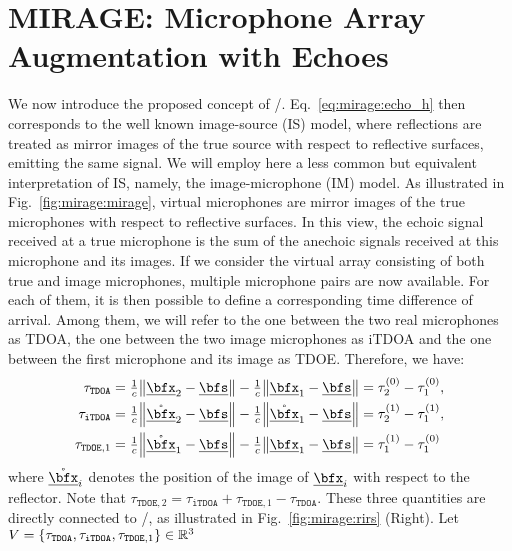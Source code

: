 \section{MIRAGE: Microphone Array Augmentation with Echoes}\label{sec:mirage:mirage}
We now introduce the proposed concept of \MIRAGEdef/.
Eq.~\cref{eq:mirage:echo_h} then corresponds to the well known image-source (IS) model,
where reflections are treated as mirror images of the true source with respect to reflective surfaces,
emitting the same signal.
We will employ here a less common but equivalent interpretation of IS,
namely, the image-microphone (IM) model. As illustrated in Fig.~\cref{fig:mirage:mirage},
virtual microphones are mirror images of the true microphones with respect to reflective surfaces.
In this view, the echoic signal received at a true microphone
is the sum of the anechoic signals received at this microphone and its images.
If we consider the virtual array consisting of both true and image microphones,
multiple microphone pairs are now available. For each of them,
it is then possible to define a corresponding time difference of arrival.
Among them, we will refer to the one between the two real microphones as \ac{TDOA}, the one between the two image microphones as \ac{iTDOA} and the one between the first microphone and its image as \ac{TDOE}.
Therefore, we have:
\begin{align}
\tau_\mathtt{TDOA}  &= \tfrac{1}{c} \norm{\positionMicrophone_2 - \positionSource} - \tfrac{1}{c} \norm{\positionMicrophone_1 - \positionSource} = \tau_2^{(0)} - \tau_1^{(0)},\\
\tau_\mathtt{iTDOA} &= \tfrac{1}{c} \norm{\mathring{\positionMicrophone}_2 - \positionSource} - \tfrac{1}{c} \norm{\mathring{\positionMicrophone}_1 - \positionSource} = \tau_2^{(1)} - \tau_1^{(1)},\\
\tau_{\mathtt{TDOE},1}  &= \tfrac{1}{c} \norm{\mathring{\positionMicrophone}_1 - \positionSource} - \tfrac{1}{c} \norm{\positionMicrophone_1 - \positionSource} = \tau_1^{(1)} - \tau_1^{(0)}\\
\end{align}
where $\mathring{\positionMicrophone}_i$ denotes the position of the image of $\positionMicrophone_i$ with respect to the reflector.
Note that $\tau_{\mathtt{TDOE},2} = \tau_\mathtt{iTDOA} + \tau_{\mathtt{TDOE}, 1} - \tau_\mathtt{TDOA}$.
These three quantities are directly connected to \RIRs/, as illustrated in Fig.~\cref{fig:mirage:rirs} (Right).
Let $V = \set{\tau_{\mathtt{TDOA}}, \tau_{\mathtt{iTDOA}}, \tau_{\mathtt{TDOE},1}}\in\mathbb{R}^3$


